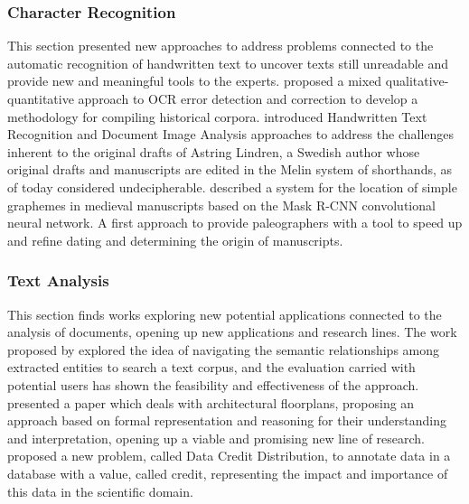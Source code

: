 \documentclass[sigconf, nonacm]{acmart}
\begin{document}
\subsubsection*{Character Recognition}
This section presented new approaches to address problems connected to the automatic recognition of handwritten text to uncover texts still unreadable and provide new and meaningful tools to the experts.
\citet{FanteN21} proposed a mixed qualitative-quantitative approach to OCR error detection and correction to develop a methodology for compiling historical corpora. 
\citet{HeilNH21} introduced Handwritten Text Recognition and Document Image Analysis approaches to address the challenges inherent to the original drafts of Astring Lindren, a Swedish author whose original drafts and manuscripts are edited in the Melin system of shorthands, as of today considered undecipherable. 
\citet{MarinaiPRS21} described a system for the location of simple graphemes in medieval manuscripts based on the Mask R-CNN convolutional neural network. A first approach to provide paleographers with a tool to speed up and refine dating and determining the origin of manuscripts.

\subsubsection*{Text Analysis}
This section finds works exploring new potential applications connected to the analysis of documents, opening up new applications and research lines. 
The work proposed by \citet{BernasconiCM21} explored the idea of navigating the semantic relationships among extracted entities to search a text corpus, and the evaluation carried with potential users has shown the feasibility and effectiveness of the approach.
\citet{Ferilli21} presented a paper which deals with architectural floorplans, proposing an approach based on formal representation and reasoning for their understanding and interpretation, opening up a viable and promising new line of research.  
\citet{DossoS21} proposed a new problem, called Data Credit Distribution, to annotate data in a database with a value, called credit, representing the impact and importance of this data in the scientific domain. 
\end{document}
